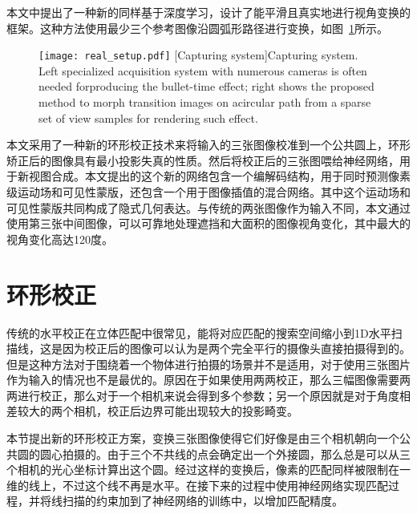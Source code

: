 本文中提出了一种新的同样基于深度学习，设计了能平滑且真实地进行视角变换的框架。这种方法使用最少三个参考图像沿圆弧形路径进行变换，如图~\ref{fig:real_setup}所示。
\begin{figure}[!htbp]
    \centering
    \texttt{[image: real\_setup.pdf]}
    [Capturing system]{Capturing system. Left specialized acquisition system with numerous cameras is often needed forproducing the bullet-time effect; right shows the proposed method to morph transition images on acircular path from a sparse set of view samples for rendering such effect.}
    \label{fig:real_setup}
\end{figure}
本文采用了一种新的环形校正技术来将输入的三张图像校准到一个公共圆上，环形矫正后的图像具有最小投影失真的性质。然后将校正后的三张图喂给神经网络，用于新视图合成。本文提出的这个新的网络包含一个编解码结构，用于同时预测像素级运动场和可见性蒙版，还包含一个用于图像插值的混合网络。其中这个运动场和可见性蒙版共同构成了隐式几何表达。与传统的两张图像作为输入不同，本文通过使用第三张中间图像，可以可靠地处理遮挡和大面积的图像视角变化，其中最大的视角变化高达120度。

\section{环形校正}
传统的水平校正在立体匹配中很常见，能将对应匹配的搜索空间缩小到1D水平扫描线，这是因为校正后的图像可以认为是两个完全平行的摄像头直接拍摄得到的。但是这种方法对于围绕着一个物体进行拍摄的场景并不是适用，对于使用三张图片作为输入的情况也不是最优的。原因在于如果使用两两校正，那么三幅图像需要两两进行校正，那么对于一个相机来说会得到多个参数；另一个原因就是对于角度相差较大的两个相机，校正后边界可能出现较大的投影畸变。

本节提出新的环形校正方案，变换三张图像使得它们好像是由三个相机朝向一个公共圆的圆心拍摄的。由于三个不共线的点会确定出一个外接圆，那么总是可以从三个相机的光心坐标计算出这个圆。经过这样的变换后，像素的匹配同样被限制在一维的线上，不过这个线不再是水平。在接下来的过程中使用神经网络实现匹配过程，并将线扫描的约束加到了神经网络的训练中，以增加匹配精度。    


